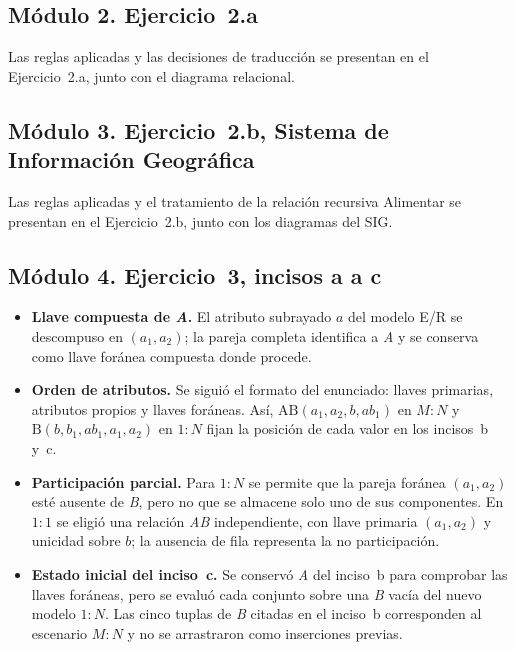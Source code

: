 \subsection{Módulo 2. Ejercicio~2.a}

Las reglas aplicadas y las decisiones de traducción se presentan en el
Ejercicio~2.a, junto con el diagrama relacional.

\subsection{Módulo 3. Ejercicio~2.b, Sistema de Información Geográfica}

Las reglas aplicadas y el tratamiento de la relación recursiva Alimentar
se presentan en el Ejercicio~2.b, junto con los diagramas del SIG.

\subsection{Módulo 4. Ejercicio~3, incisos a a c}

\begin{itemize}
  \item \textbf{Llave compuesta de \emph{A}.} El atributo subrayado $a$ del
        modelo E/R se descompuso en $(a_1,a_2)$; la pareja completa identifica
        a \emph{A} y se conserva como llave foránea compuesta donde procede.
  \item \textbf{Orden de atributos.} Se siguió el formato del enunciado:
        llaves primarias, atributos propios y llaves foráneas. Así,
        $\mathrm{AB}(a_1,a_2,b,ab_1)$ en $M:N$ y
        $\mathrm{B}(b,b_1,ab_1,a_1,a_2)$ en $1:N$ fijan la posición de cada
        valor en los incisos~b y~c.
  \item \textbf{Participación parcial.} Para $1:N$ se permite que la pareja
        foránea $(a_1,a_2)$ esté ausente de \emph{B}, pero no que se almacene
        solo uno de sus componentes. En $1:1$ se eligió una relación
        \emph{AB} independiente, con llave primaria $(a_1,a_2)$ y unicidad
        sobre $b$; la ausencia de fila representa la no participación.
  \item \textbf{Estado inicial del inciso~c.} Se conservó \emph{A} del
        inciso~b para comprobar las llaves foráneas, pero se evaluó cada
        conjunto sobre una \emph{B} vacía del nuevo modelo $1:N$. Las cinco
        tuplas de \emph{B} citadas en el inciso~b corresponden al escenario
        $M:N$ y no se arrastraron como inserciones previas.
\end{itemize}


